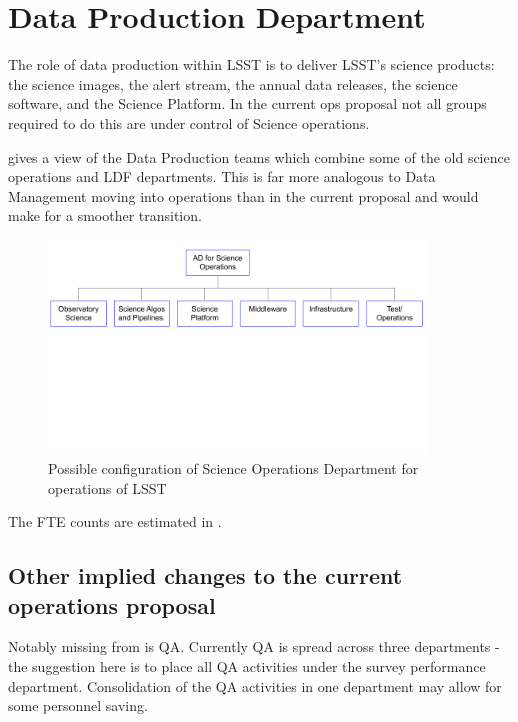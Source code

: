 
\section{Data Production Department }\label{sec:sciops} \label{sec:dataprod}

The role of data production within \gls{LSST} is to deliver \gls{LSST}'s science products: the science images, the alert stream, the annual data releases, the science \gls{software}, and the Science Platform. In the current ops proposal not all groups required to do this are under control of Science operations.

 gives a view of the Data Production teams which combine some of the old science operations  and LDF departments. This is far more analogous to Data Management moving into operations than in the current proposal and would make for a smoother transition.

\begin{figure}
\begin{center}
\includegraphics[width=0.9\textwidth]{figures/SciOpsOrg}
\caption{Possible configuration of Science Operations Department for operations of \gls{LSST} \label{fig:sciopsorg}}
\end{center}
\end{figure}

The FTE counts are estimated in .




\subsection{Other implied changes to the current operations proposal}
Notably missing from  is \gls{QA}. Currently \gls{QA} is spread across  three
 departments - the suggestion here is to place all \gls{QA} activities under the survey performance department. Consolidation
of the \gls{QA} activities in one department may allow for some personnel saving.

